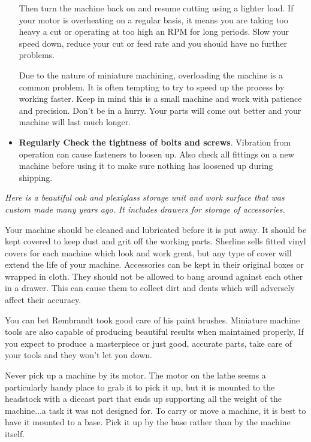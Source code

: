 \begin{itemize}
  Then turn the machine back on and resume cutting using a lighter load. If your
  motor is overheating on a regular basis, it means you are taking too heavy a
  cut or operating at too high an RPM for long periods. Slow your speed down,
  reduce your cut or feed rate and you should have no further problems.
  
  Due to the nature of miniature machining, overloading the machine is a common
  problem. It is often tempting to try to speed up the process by working
  faster. Keep in mind this is a small machine and work with patience and
  precision. Don't be in a hurry. Your parts will come out better and your
  machine will last much longer.

  \item \textbf{Regularly Check the tightness of bolts and screws}. Vibration
  from operation can cause fasteners to loosen up. Also check all fittings on a
  new machine before using it to make sure nothing has loosened up during
  shipping.
\end{itemize}

\bigskip
\textit{Here is a beautiful oak and plexiglass storage unit and work surface
that was custom made many years ago. It includes drawers for storage of
accessories.}
\bigskip


Your machine should be cleaned and lubricated before it is put away. It should
be kept covered to keep dust and grit off the working parts. Sherline sells
fitted vinyl covers for each machine which look and work great, but any type of
cover will extend the life of your machine. Accessories can be kept in their
original boxes or wrapped in cloth. They should not be allowed to bang around
against each other in a drawer. This can cause them to collect dirt and dents
which will adversely affect their accuracy.

You can bet Rembrandt took good care of his paint brushes. Miniature machine
tools are also capable of producing beautiful results when maintained properly,
If you expect to produce a masterpiece or just good, accurate parts, take care
of your tools and they won't let you down.


Never pick up a machine by its motor. The motor on the lathe seems a
particularly handy place to grab it to pick it up, but it is mounted to the
headstock with a diecast part that ends up supporting all the weight of the
machine...a task it was not designed for. To carry or move a machine, it is best
to have it mounted to a base. Pick it up by the base rather than by the machine
itself.

